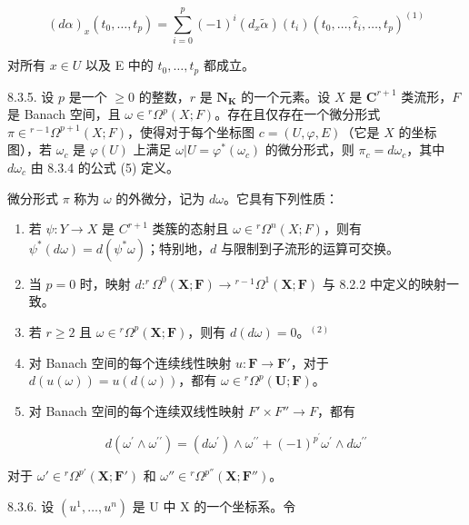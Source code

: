 \[
(d \alpha) _ {x} (t _ {0}, \dots , t _ {p}) = \sum_ {i = 0} ^ {p} (- 1) ^ {i} (d _ {x} \tilde {\alpha}) (t _ {i}) (t _ {0}, \dots , \hat {t} _ {i}, \dots , t _ {p}) ^ {(1)}\tag{5}
\]

对所有 \(x \in U\) 以及 E 中的 \(t_{0}, \ldots, t_{p}\) 都成立。

8.3.5. 设 \(p\) 是一个 \(\geqslant 0\) 的整数，\(r\) 是 \(\mathbf{N}_{\mathbf{K}}\) 的一个元素。设 \(X\) 是 \(\mathbf{C}^{r+1}\) 类流形，\(F\) 是 Banach 空间，且 \(\omega \in {}^r\Omega^p(X;F)\)。存在且仅存在一个微分形式 \(\pi \in {}^{r-1}\Omega^{p+1}(X;F)\)，使得对于每个坐标图 \(c = (U,\varphi,E)\)（它是 \(X\) 的坐标图），若 \(\omega_c\) 是 \(\varphi(U)\) 上满足 \(\omega|U = \varphi^*(\omega_c)\) 的微分形式，则 \(\pi_c = d\omega_c\)，其中 \(d\omega_c\) 由 8.3.4 的公式 (5) 定义。

微分形式 \(\pi\) 称为 \(\omega\) 的外微分，记为 \(d\omega\)。它具有下列性质：

\begin{enumerate}
\def\labelenumi{(\arabic{enumi})}
\setcounter{enumi}{5}
\item
  若 \(\psi: Y \to X\) 是 \(C^{r+1}\) 类簇的态射且 \(\omega \in {}^r\Omega^n(X; F)\)，则有 \(\psi^*(d\omega) = d(\psi^*\omega)\)；特别地，\(d\) 与限制到子流形的运算可交换。
\item
  当 \(p = 0\) 时，映射 \(d: ^r\Omega^0(\mathbf{X}; \mathbf{F}) \to {}^{r-1}\Omega^1(\mathbf{X}; \mathbf{F})\) 与 8.2.2 中定义的映射一致。
\item
  若 \(r \geqslant 2\) 且 \(\omega \in {}^r\Omega^p(\mathbf{X};\mathbf{F})\)，则有 \(d(d\omega) = 0\)。\(^{(2)}\)
\item
  对 Banach 空间的每个连续线性映射 \(u: \mathbf{F} \to \mathbf{F}'\)，对于 \(d(u(\omega)) = u(d(\omega))\)，都有 \(\omega \in {}^{r}\Omega^{p}(\mathbf{U}; \mathbf{F})\)。
\item
  对 Banach 空间的每个连续双线性映射 \(F' \times F'' \rightarrow F\)，都有
\end{enumerate}

\[
d \left(\omega^ {\prime} \wedge \omega^ {\prime \prime}\right) = \left(d \omega^ {\prime}\right) \wedge \omega^ {\prime \prime} + (- 1) ^ {p ^ {\prime}} \omega^ {\prime} \wedge d \omega^ {\prime \prime}
\]

对于 \(\omega' \in {}^r\Omega^{p'}(\mathbf{X}; \mathbf{F}')\) 和 \(\omega'' \in {}^r\Omega^{p''}(\mathbf{X}; \mathbf{F}'')\)。


8.3.6. 设 \((u^{1},\ldots ,u^{n})\) 是 U 中 X 的一个坐标系。令

